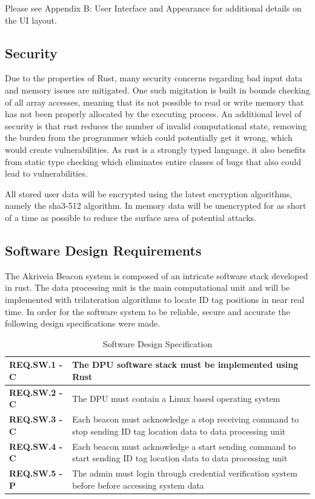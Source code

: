 \bigskip
Please see Appendix B: User Interface and Appearance for additional details on the UI layout.

\subsection{Security}
\medskip
Due to the properties of Rust, many security concerns regarding bad input data and memory issues are mitigated.
One such migitation is built in bounds checking of all array accesses, meaning that its not possible to read or write memory that has not been properly allocated by the executing process.
An additional level of security is that rust reduces the number of invalid computational state, removing the burden from the programmer which could potentially get it wrong, which would create vulnerabilities.
As rust is a strongly typed language, it also benefits from static type checking which eliminates entire classes of bugs that also could lead to vulnerabilities.

\bigskip
All stored user data will be encrypted using the latest encryption algorithms, namely the sha3-512 algorithm.
In memory data will be unencrypted for as short of a time as possible to reduce the surface area of potential attacks.


\pagebreak
\subsection{Software Design Requirements}
\medskip
The Akriveia Beacon system is composed of an intricate software stack developed in rust.
The data processing unit is the main computational unit and will be implemented with trilateration algorithms to locate ID tag positions in near real time.
In order for the software system to be reliable, secure and accurate the following design specifications were made.

\medskip
\bgroup
\def\arraystretch{1.5}
\begin{table}[H]
\centering
\begin{tabular}{ | m{3cm} | m{12.5cm} |}
\hline
\textbf{REQ.SW.1 - C} &  The DPU software stack must be implemented using Rust  \\
\hline
\textbf{REQ.SW.2 - C} &  The DPU must contain a Linux based operating system  \\
\hline
\textbf{REQ.SW.3 - C} &  Each beacon must acknowledge a stop receiving command to stop sending ID tag location data to data processing unit \\
\hline
\textbf{REQ.SW.4 - C} &  Each beacon must acknowledge a start sending command to start sending ID tag location data to data processing unit  \\
\hline
\textbf{REQ.SW.5 - P} &  The admin must login through credential verification system before before accessing system data \\
\hline
\end{tabular}
\caption{Software Design Specification}
\end{table}

